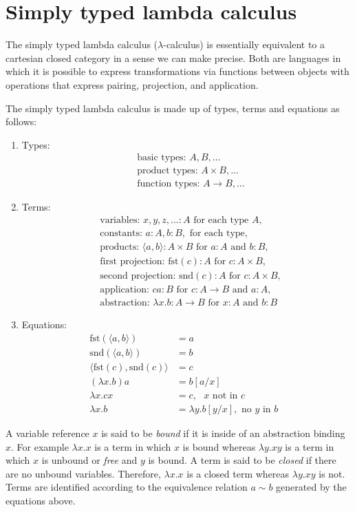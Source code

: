 \section*{Simply typed lambda calculus}
The simply typed lambda calculus ($\lambda$-calculus) is essentially equivalent to a cartesian closed category in a sense we can make precise. Both are languages in which it is possible to express transformations via functions between objects with operations that express pairing, projection, and application.

The simply typed lambda calculus is made up of types, terms and equations as follows:
\begin{enumerate}
\item{Types:}
\begin{align*}
&\mbox{basic types: } A, B, \ldots\\
&\mbox{product types: } A \times B, \ldots\\ 
&\mbox{function types: } A \rightarrow B, \ldots
\end{align*}
\item{Terms:}
\begin{align*}
&\mbox{variables: } x, y, z, \ldots \colon A \mbox{ for each type } A,\\
&\mbox{constants: } a \colon A, b \colon B, \mbox{ for each type},\\
&\mbox{products: }\langle a, b \rangle \colon A \times B \mbox{ for } a:A \mbox{ and } b:B,\\
&\mbox{first projection: }\mbox{fst}(c) \colon A \mbox{ for } c \colon A \times B,\\
&\mbox{second projection: }\mbox{snd}(c) \colon A \mbox{ for } c \colon A \times B,\\
&\mbox{application: }ca \colon B \mbox{ for } c \colon A \rightarrow B \mbox{ and } a \colon A,\\
&\mbox{abstraction: }\lambda x. b \colon A \rightarrow B \mbox{ for } x \colon A \mbox{ and } b \colon B
\end{align*}
\item{Equations:}
\begin{align*}
            \mbox{fst}(\langle a, b \rangle) &= a\\
            \mbox{snd}(\langle a, b \rangle) &= b\\
            \langle \mbox{fst}(c), \mbox{snd}(c) \rangle &= c\\
            (\lambda x.b)a &= b[a/x]\\
            \lambda x.cx &= c, \mbox{ $x$ not in $c$ }\\
            \lambda x.b &= \lambda y.b [y/x], \mbox{ no $y$ in $b$ }
\end{align*}
\end{enumerate}
A variable reference $x$ is said to be \emph{bound} if it is inside of an abstraction binding $x$. For example $\lambda x. x$ is a term in which $x$ is bound whereas $\lambda y. x y$ is a term in which $x$ is unbound or \emph{free} and $y$ is bound. A term is said to be \emph{closed} if there are no unbound variables. Therefore, $\lambda x.x$ is a closed term whereas $\lambda y.xy$ is not. Terms are identified according to the equivalence relation $a \sim b$ generated by the equations above.

